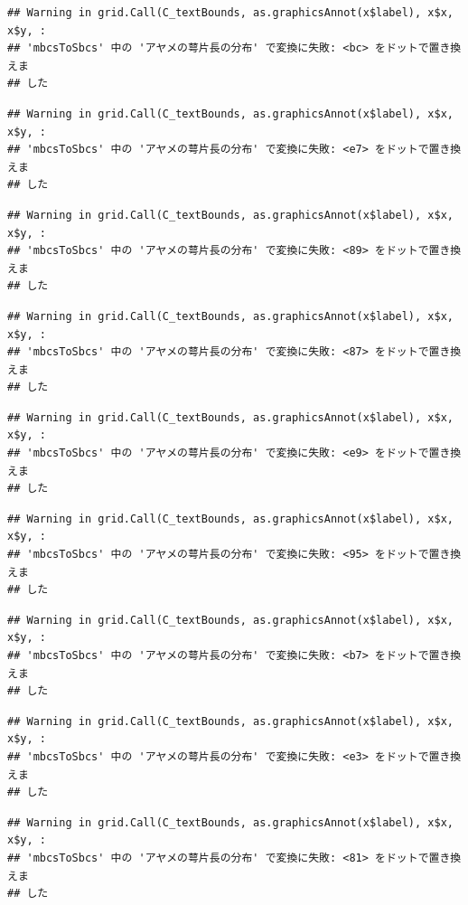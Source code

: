 \documentclass[
]{book}
\begin{document}
\begin{verbatim}
## Warning in grid.Call(C_textBounds, as.graphicsAnnot(x$label), x$x, x$y, :
## 'mbcsToSbcs' 中の 'アヤメの萼片長の分布' で変換に失敗: <bc> をドットで置き換えま
## した
\end{verbatim}

\begin{verbatim}
## Warning in grid.Call(C_textBounds, as.graphicsAnnot(x$label), x$x, x$y, :
## 'mbcsToSbcs' 中の 'アヤメの萼片長の分布' で変換に失敗: <e7> をドットで置き換えま
## した
\end{verbatim}

\begin{verbatim}
## Warning in grid.Call(C_textBounds, as.graphicsAnnot(x$label), x$x, x$y, :
## 'mbcsToSbcs' 中の 'アヤメの萼片長の分布' で変換に失敗: <89> をドットで置き換えま
## した
\end{verbatim}

\begin{verbatim}
## Warning in grid.Call(C_textBounds, as.graphicsAnnot(x$label), x$x, x$y, :
## 'mbcsToSbcs' 中の 'アヤメの萼片長の分布' で変換に失敗: <87> をドットで置き換えま
## した
\end{verbatim}

\begin{verbatim}
## Warning in grid.Call(C_textBounds, as.graphicsAnnot(x$label), x$x, x$y, :
## 'mbcsToSbcs' 中の 'アヤメの萼片長の分布' で変換に失敗: <e9> をドットで置き換えま
## した
\end{verbatim}

\begin{verbatim}
## Warning in grid.Call(C_textBounds, as.graphicsAnnot(x$label), x$x, x$y, :
## 'mbcsToSbcs' 中の 'アヤメの萼片長の分布' で変換に失敗: <95> をドットで置き換えま
## した
\end{verbatim}

\begin{verbatim}
## Warning in grid.Call(C_textBounds, as.graphicsAnnot(x$label), x$x, x$y, :
## 'mbcsToSbcs' 中の 'アヤメの萼片長の分布' で変換に失敗: <b7> をドットで置き換えま
## した
\end{verbatim}

\begin{verbatim}
## Warning in grid.Call(C_textBounds, as.graphicsAnnot(x$label), x$x, x$y, :
## 'mbcsToSbcs' 中の 'アヤメの萼片長の分布' で変換に失敗: <e3> をドットで置き換えま
## した
\end{verbatim}

\begin{verbatim}
## Warning in grid.Call(C_textBounds, as.graphicsAnnot(x$label), x$x, x$y, :
## 'mbcsToSbcs' 中の 'アヤメの萼片長の分布' で変換に失敗: <81> をドットで置き換えま
## した
\end{verbatim}
\end{document}
